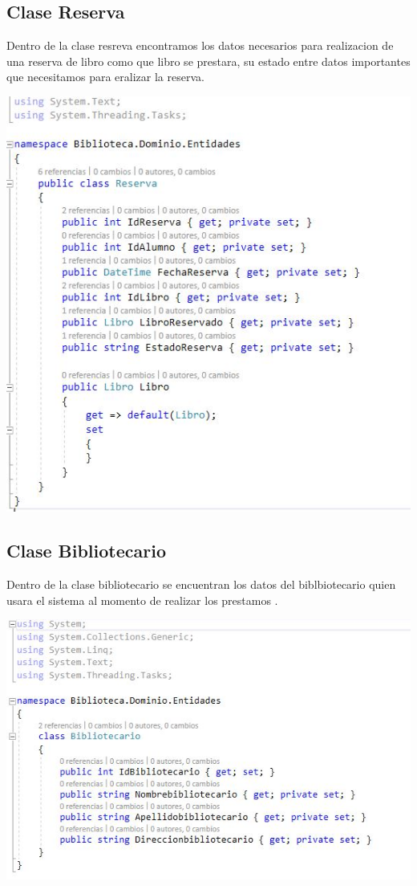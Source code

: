  \subsection{Clase Reserva}
 Dentro de la clase resreva encontramos los datos necesarios para realizacion de una reserva de libro como que libro se prestara, su estado entre datos importantes que necesitamos para eralizar la reserva.
 	\begin{center}
	\includegraphics[width=14cm]{./Imagenes/img13reserva} 
	\end{center}
	
 \newpage
 \subsection{Clase Bibliotecario}
 Dentro de la clase  bibliotecario se encuentran los datos del biblbiotecario quien usara el sistema al momento de realizar los prestamos .
 	\begin{center}
	\includegraphics[width=14cm]{./Imagenes/img11bibliotecario} 
	\end{center}
